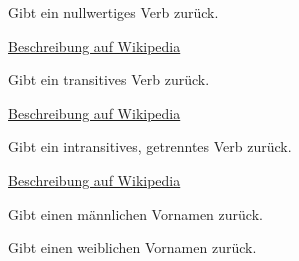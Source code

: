 \documentclass[a4paper,12pt,oneside]{sphinxmanual}
\begin{document}

\begin{fulllineitems}
\label{funktionen:pyzufall.verbn}
Gibt ein nullwertiges Verb zurück.

\href{http://de.wikipedia.org/wiki/Transitivität\_(Grammatik)\#Festlegung\_der\_Transitivit.C3.A4t\_eines\_Verbs/}{Beschreibung auf Wikipedia}

\end{fulllineitems}


\begin{fulllineitems}
\label{funktionen:pyzufall.verbt}
Gibt ein transitives Verb zurück.

\href{http://de.wikipedia.org/wiki/Transitivität\_(Grammatik)\#Festlegung\_der\_Transitivit.C3.A4t\_eines\_Verbs/}{Beschreibung auf Wikipedia}

\end{fulllineitems}


\begin{fulllineitems}
\label{funktionen:pyzufall.verbt2}
Gibt ein intransitives, getrenntes Verb zurück.

\href{http://de.wikipedia.org/wiki/Transitivität\_(Grammatik)\#Festlegung\_der\_Transitivit.C3.A4t\_eines\_Verbs/}{Beschreibung auf Wikipedia}

\end{fulllineitems}


\begin{fulllineitems}
\label{funktionen:pyzufall.vorname_m}
Gibt einen männlichen Vornamen zurück.

\end{fulllineitems}


\begin{fulllineitems}
\label{funktionen:pyzufall.vorname_w}
Gibt einen weiblichen Vornamen zurück.

\end{fulllineitems}
\end{document}

